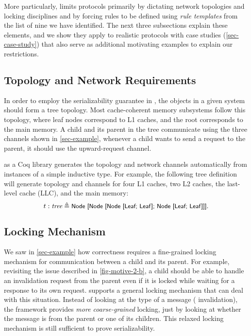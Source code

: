 \documentclass[sigplan,10pt,review,anonymous,screen]{acmart}\settopmatter{printfolios=true,printccs=false,printacmref=false}
\begin{document}
More particularly, \hemiola{} limits protocols primarily by dictating network topologies and locking disciplines and by forcing rules to be defined using \emph{rule templates} from the list of nine we have identified.
The next three subsections explain these elements, and we show they apply to realistic protocols with case studies (\autoref{sec-case-study}) that also serve as additional motivating examples to explain our restrictions.

\subsection{Topology and Network Requirements}

In order to employ the serializability guarantee in \hemiola{}, the objects in a given system should form a tree topology.
Most cache-coherent memory subsystems follow this topology, where leaf nodes correspond to L1 caches, and the root corresponds to the main memory.
A child and its parent in the tree communicate using the three channels shown in \autoref{sec-example}, \eg{} whenever a child wants to send a request to the parent, it should use the upward-request channel.

\hemiola{} as a Coq library generates the topology and network channels automatically from instances of a simple inductive type.
For example, the following tree definition will generate topology and channels for four L1 caches, two L2 caches, the last-level cache (LLC), and the main memory:
\begin{displaymath}
  t : \textit{tree} \triangleq \small{\textsf{Node [Node [Node [Leaf; Leaf]; Node [Leaf; Leaf]]]}}.
\end{displaymath}

\subsection{Locking Mechanism}
\label{sec-locking-mechanism}

We saw in \autoref{sec-example} how correctness requires a fine-grained locking mechanism for communication between a child and its parent.
For example, revisiting the issue described in \autoref{fig-motive-2-b}, a child should be able to handle an invalidation request from the parent even if it is locked while waiting for a response to its own request.
\hemiola{} supports a general locking mechanism that can deal with this situation.
Instead of looking at the type of a message (\eg{} invalidation), the framework provides \emph{more coarse-grained} locking, just by looking at whether the message is from the parent or one of its children.
This relaxed locking mechanism is still sufficient to prove serializability.
\end{document}
